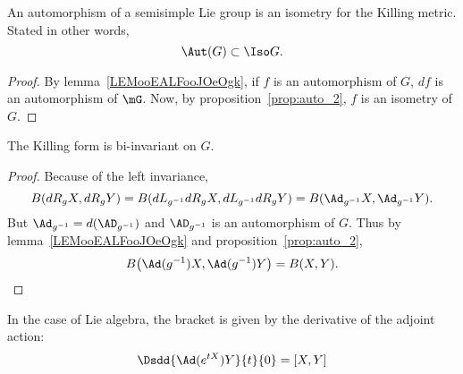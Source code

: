 \begin{corollary}
An automorphism of a semisimple Lie group is an isometry for the Killing metric. Stated in other words,
    \begin{equation}\label{eq:Aut_Iso}
        \Aut(G)\subset\Iso G.
    \end{equation}
\end{corollary}

\begin{proof}
    By lemma~\ref{LEMooEALFooJOeOgk}, if $f$ is an automorphism of $G$, $df$ is an automorphism of $\mG$. Now, by proposition~\ref{prop:auto_2}, $f$ is an isometry of $G$.
\end{proof}

\begin{theorem}
The Killing form is bi-invariant on $G$.
\label{tho:bi_invariance}
\end{theorem}

\begin{proof}
Because of the left invariance,
\[
  B(dR_gX,dR_gY)=B(dL_{g^{-1}}dR_gX,dL_{g^{-1}}dR_gY)=B(\Ad_{g^{-1}}X,\Ad_{g^{-1}}Y).
\]
But $\Ad_{g^{-1}}=d(\AD_{g^{-1}})$ and $\AD_{g^{-1}}$ is an automorphism of $G$. Thus by lemma~\ref{LEMooEALFooJOeOgk} and proposition~\ref{prop:auto_2},
\begin{equation}                    \label{eq_KillAdinvariant}
B\big(\Ad(g^{-1})X,\Ad(g^{-1})Y\big)=B(X,Y).
\end{equation}
\end{proof}

\begin{lemma}
	In the case of Lie algebra, the bracket is given by the derivative of the adjoint action:
	\begin{equation}
		\Dsdd{ \Ad( e^{tX})Y }{t}{0}=[X,Y]
	\end{equation}
\end{lemma}

